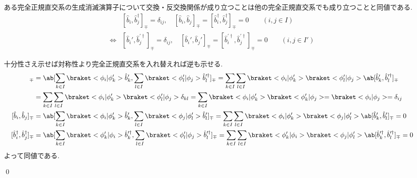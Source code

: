 \documentclass[uplatex,dvipdfmx,a4paper,11pt]{jlreq}
\makeatletter
\numberwithin{equation}{section}
\theoremstyle{definition}
\renewenvironment{proof}[1][\proofname]{\par
  \normalfont
  \topsep6\p@\@plus6\p@ \trivlist
  \item[\hskip\labelsep{\bfseries #1}\@addpunct{\bfseries}]\ignorespaces\quad\par
}{
  \qed\endtrivlist\@endpefalse
}
\renewcommand\proofname{証明}
\makeatother
\begin{document}
\begin{theorem}[Q21-80]
  ある完全正規直交系の生成消滅演算子について交換・反交換関係が成り立つことは他の完全正規直交系でも成り立つことと同値である.
  \begin{align}
         & [\hat{b}_i, \hat{b}_j^\dagger]_\mp = \delta_{ij}, \quad [\hat{b}_i, \hat{b}_j]_\mp = [\hat{b}_i^\dagger, \hat{b}_j^\dagger]_\mp = 0                            \qquad (i, j \in I)  \\
    \iff & [\hat{b}_i', \hat{b}_j^{\prime\dagger}]_\mp = \delta_{ij}, \quad [\hat{b}_i', \hat{b}_j']_\mp = [\hat{b}_i^{\prime\dagger}, \hat{b}_j^{\prime\dagger}]_\mp = 0 \qquad (i, j \in I')
  \end{align}
  \label{exchange equivalent}
\end{theorem}
\begin{proof}
  十分性さえ示せば対称性より完全正規直交系を入れ替えれば逆も示せる.
  \begin{align}
    [\hat{b}_i, \hat{b}_j^\dagger]_\mp         & = \ab[\sum_{k\in I}\braket<\phi_i|\phi_k'>\hat{b}_k', \sum_{l\in I}\braket<\phi_l'|\phi_j>\hat{b}_l^{\prime\dagger}]_\mp = \sum_{k\in I}\sum_{l\in I}\braket<\phi_i|\phi_k'>\braket<\phi_l'|\phi_j>\ab[\hat{b}_k', \hat{b}_l^{\prime\dagger}]_\mp                                   \\
                                               & = \sum_{k\in I}\sum_{l\in I}\braket<\phi_i|\phi_k'>\braket<\phi_l'|\phi_j>\delta_{kl} = \sum_{k\in I}\braket<\phi_i|\phi_k'>\braket<\phi_k'|\phi_j> = \braket<\phi_i|\phi_j> = \delta_{ij}                                                                                          \\
    [\hat{b}_i, \hat{b}_j]_\mp                 & = \ab[\sum_{k\in I}\braket<\phi_i|\phi_k'>\hat{b}_k', \sum_{l\in I}\braket<\phi_j|\phi_l'>\hat{b}_l']_\mp = \sum_{k\in I}\sum_{l\in I}\braket<\phi_i|\phi_k'>\braket<\phi_j|\phi_l'>\ab[\hat{b}_k', \hat{b}_l']_\mp = 0                                                             \\
    [\hat{b}_i^\dagger, \hat{b}_j^\dagger]_\mp & = \ab[\sum_{k\in I}\braket<\phi_k'|\phi_i>\hat{b}_k^{\prime\dagger}, \sum_{l\in I}\braket<\phi_l'|\phi_j>\hat{b}_l^{\prime\dagger}]_\mp = \sum_{k\in I}\sum_{l\in I}\braket<\phi_k'|\phi_i>\braket<\phi_j|\phi_l'>\ab[\hat{b}_k^{\prime\dagger}, \hat{b}_l^{\prime\dagger}]_\mp = 0
  \end{align}
  よって同値である.
\end{proof}
\end{document}
